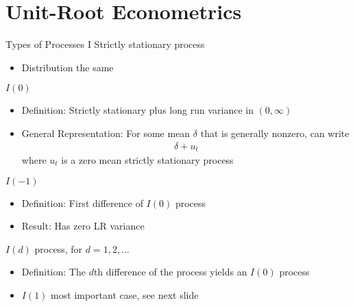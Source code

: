\documentclass[aspectratio=169, handout]{beamer}
\begin{document}


\section{Unit-Root Econometrics}

{\scriptsize
\begin{frame}{Types of Processes I}
Strictly stationary process
\begin{itemize}
  \item Distribution the same
\end{itemize}
$I(0)$
\begin{itemize}
  \item \alert{Definition}:
    Strictly stationary plus long run variance in $(0,\infty)$
  \item \alert{General Representation}:
    For some mean $\delta$ that is generally nonzero, can write
    \begin{align*}
      \delta + u_t
    \end{align*}
    where $u_t$ is a zero mean strictly stationary process
\end{itemize}
$I(-1)$
\begin{itemize}
  \item \alert{Definition}: First difference of $I(0)$ process
  \item \alert{Result}: Has zero LR variance
\end{itemize}
$I(d)$ process, for $d=1,2,\ldots$
\begin{itemize}
  \item \alert{Definition}:
    The $d$th difference of the process yields an $I(0)$ process
  \item $I(1)$ most important case, see next slide
\end{itemize}
\end{frame}
}
\end{document}
